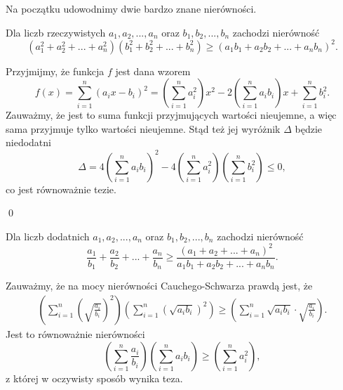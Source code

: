 

\noindent
Na początku udowodnimy dwie bardzo znane nierówności. 

\vspace{10px}


\noindent
Dla liczb rzeczywistych $a_1, a_2, ..., a_n$ oraz $b_1, b_2, ..., b_n$ zachodzi nierówność
\[
	\left(a_1^2 + a_2^2 + ... + a_n^2\right)\left(b_1^2 + b_2^2 + ... + b_n^2\right) \geqslant \left(a_1b_1 + a_2b_2 + ... + a_nb_n\right)^2.
\]


\noindent
Przyjmijmy, że funkcja $f$ jest dana wzorem
\[
	f(x) = \sum^{n}_{i=1} (a_ix - b_i)^2 = \left(\sum^{n}_{i=1} a_i^2\right) x^2 - 2\left(\sum^{n}_{i=1} a_ib_i\right) x + \sum^{n}_{i=1} b_i^2.
\]
Zauważmy, że jest to suma funkcji przyjmujących wartości nieujemne, a więc sama przyjmuje tylko wartości nieujemne. Stąd też jej wyróżnik $\Delta$ będzie niedodatni
\[
	\Delta = 4\left(\sum^{n}_{i=1} a_ib_i\right)^2 - 4  \left(\sum^{n}_{i=1} a_i^2\right)  \left(\sum^{n}_{i=1} b_i^2\right) \leqslant 0,
\]
co jest równoważnie tezie.

\qed

\vspace{10px}



\noindent
Dla liczb dodatnich $a_1, a_2, ..., a_n$ oraz $b_1, b_2, ..., b_n$ zachodzi nierówność
\[
	\frac{a_1}{b_1} + \frac{a_2}{b_2} + ... + \frac{a_n}{b_n} \geqslant \frac{\left(a_1 + a_2 + ... + a_n\right)^2}{a_1b_1 + a_2b_2 + ... + a_nb_n}.
\]


\noindent
Zauważmy, że na mocy nierówności Cauchego-Schwarza prawdą jest, że
\begin{gather*}
	\left(\sum^{n}_{i = 1} \left(\sqrt{\frac{a_i}{b_i}}\right)^2 \right) \left(\sum^{n}_{i = 1} \left(\sqrt{a_ib_i}\right)^2 \right) \geqslant \left(\sum^{n}_{i = 1} \sqrt{a_ib_i} \cdot \sqrt{\frac{a_i}{b_i}} \right).
\end{gather*}
Jest to równoważnie nierówności
\[
	\left(\sum^{n}_{i = 1} \frac{a_i}{b_i} \right) \left(\sum^{n}_{i = 1} a_ib_i \right) \geqslant \left(\sum^{n}_{i = 1} a_i^2 \right),
\]
z której w oczywisty sposób wynika teza.

